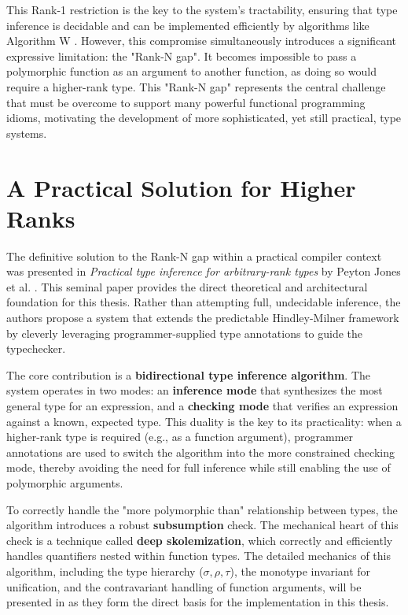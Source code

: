This Rank-1 restriction is the key to the system's tractability, ensuring that type inference is decidable and can be implemented efficiently by algorithms like Algorithm W \cite{jones-practical-2007}. However, this compromise simultaneously introduces a significant expressive limitation: the "Rank-N gap". It becomes impossible to pass a polymorphic function as an argument to another function, as doing so would require a higher-rank type. This "Rank-N gap" represents the central challenge that must be overcome to support many powerful functional programming idioms, motivating the development of more sophisticated, yet still practical, type systems.

\section{A Practical Solution for Higher Ranks}
\label{sec:LitReviewJones2007}

The definitive solution to the Rank-N gap within a practical compiler context was presented in \textit{Practical type inference for arbitrary-rank types} by Peyton Jones et al. \cite{jones-practical-2007}. This seminal paper provides the direct theoretical and architectural foundation for this thesis. Rather than attempting full, undecidable inference, the authors propose a system that extends the predictable Hindley-Milner framework by cleverly leveraging programmer-supplied type annotations to guide the typechecker.

The core contribution is a \textbf{bidirectional type inference algorithm}. The system operates in two modes: an \textbf{inference mode} that synthesizes the most general type for an expression, and a \textbf{checking mode} that verifies an expression against a known, expected type. This duality is the key to its practicality: when a higher-rank type is required (e.g., as a function argument), programmer annotations are used to switch the algorithm into the more constrained checking mode, thereby avoiding the need for full inference while still enabling the use of polymorphic arguments.

To correctly handle the "more polymorphic than" relationship between types, the algorithm introduces a robust \textbf{subsumption} check. The mechanical heart of this check is a technique called \textbf{deep skolemization}, which correctly and efficiently handles quantifiers nested within function types. The detailed mechanics of this algorithm, including the type hierarchy ($\sigma, \rho, \tau$), the monotype invariant for unification, and the contravariant handling of function arguments, will be presented in  as they form the direct basis for the implementation in this thesis.

